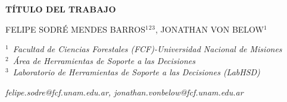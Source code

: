 \documentclass[11pt]{article}
\begin{document}
\begin{center}
\begin{Large}
\textbf{TÍTULO DEL TRABAJO}
\end{Large}
\vspace{0.6cm}

FELIPE SODRÉ MENDES BARROS$^1$$^2$$^3$, JONATHAN VON BELOW$^1$  

\vspace{0.6cm}
\textit{$^1$\  Facultad de Ciencias Forestales (FCF)-Universidad Nacional de Misiones}\\
\textit{$^2$\ Área de Herramientas de Soporte a las Decisiones}\\
\textit{$^3$\ Laboratorio de Herramientas de Soporte a las Decisiones (LabHSD)}

\vspace{0.6cm}
\textit{felipe.sodre@fcf.unam.edu.ar, jonathan.vonbelow@fcf.unam.edu.ar }
\end{center}
\end{document}
